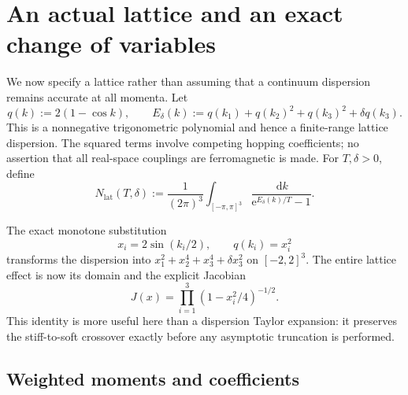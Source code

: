 \documentclass[11pt,a4paper]{article}
\numberwithin{equation}{section}
\theoremstyle{definition}
\newcommand{\dd}{\,\mathrm d}
\newcommand{\latt}{\mathrm{lat}}
\newcommand{\e}{\mathrm e}
\begin{document}
\section{An actual lattice and an exact change of variables}
\label{sec:lattice}

We now specify a lattice rather than assuming that a continuum
dispersion remains accurate at all momenta. Let
\begin{equation}
 q(k):=2(1-\cos k),\qquad
 E_\delta(k):=q(k_1)+q(k_2)^2+q(k_3)^2+\delta q(k_3).
 \label{eq:latticedispersion}
\end{equation}
This is a nonnegative trigonometric polynomial and hence a finite-range
lattice dispersion. The squared terms involve competing hopping
coefficients; no assertion that all real-space couplings are
ferromagnetic is made. For $T,\delta>0$, define
\begin{equation}
 N_{\latt}(T,\delta):=\frac1{(2\pi)^3}
 \int_{[-\pi,\pi]^3}\frac{\dd k}{\e^{E_\delta(k)/T}-1}.
 \label{eq:Nlat}
\end{equation}

The exact monotone substitution
\begin{equation}
 x_i=2\sin(k_i/2),\qquad q(k_i)=x_i^2
 \label{eq:sinchange}
\end{equation}
transforms the dispersion into
$x_1^2+x_2^4+x_3^4+\delta x_3^2$ on $[-2,2]^3$. The entire lattice
effect is now its domain and the explicit Jacobian
\begin{equation}
 J(x)=\prod_{i=1}^3(1-x_i^2/4)^{-1/2}.
 \label{eq:Jacobian}
\end{equation}
This identity is more useful here than a dispersion Taylor expansion:
it preserves the stiff-to-soft crossover exactly before any asymptotic
truncation is performed.

\subsection{Weighted moments and coefficients}
\end{document}
